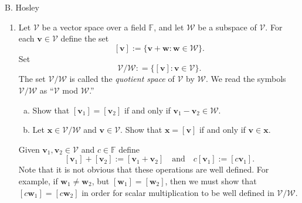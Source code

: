 \documentclass[12pt]{amsart}
\newcommand{\1}{\mathbbm{1}}
\numberwithin{equation}{section}
\numberwithin{Theorem}{section}
\theoremstyle{plain} %
\theoremstyle{definition}
\theoremstyle{remark}
\begin{document}
\thispagestyle{empty}

\hspace{\fill} {\Large B. Hosley}
\bigskip


\begin{enumerate}[1.]



\item Let \(\mathcal{V}\) be a vector space over a field \(\mathbb{F}\), and let \(\mathcal{W}\) be a subspace of \(\mathcal{V}\). For each \(\mathbf{v}\in\mathcal{V}\) define the set
\[[\mathbf{v}]:=\{\mathbf{v}+\mathbf{w} : \mathbf{w}\in\mathcal{W}\}.\]
Set
\[\mathcal{V}/\mathcal{W}: = \{[\mathbf{v}] : \mathbf{v}\in\mathcal{V}\}.\]
The set \(\mathcal{V}/\mathcal{W}\) is called the \textit{quotient space} of \(\mathcal{V}\) by \(\mathcal{W}\). We read the symbols \(\mathcal{V}/\mathcal{W}\) as ``\(\mathcal{V}\) mod \(\mathcal{W}\).''



\bigskip

\begin{enumerate}[(a)]



\item Show that \([\mathbf{v}_{1}]=[\mathbf{v}_{2}]\) if and only if \(\mathbf{v}_{1}-\mathbf{v}_{2}\in\mathcal{W}\).

\bigskip

\item Let \(\mathbf{x}\in\mathcal{V}/\mathcal{W}\) and \(\mathbf{v}\in\mathcal{V}\). Show that \(\mathbf{x}=[\mathbf{v}]\) if and only if \(\mathbf{v}\in\mathbf{x}\).

\bigskip

\end{enumerate}

\noindent Given \(\mathbf{v}_{1},\mathbf{v}_{2}\in\mathcal{V}\) and \(c\in\mathbb{F}\) define
\[[\mathbf{v}_{1}]+[\mathbf{v}_{2}]:=[\mathbf{v}_{1}+\mathbf{v}_{2}]\quad\text{and}\quad c[\mathbf{v}_{1}] := [c\mathbf{v}_{1}].\]
Note that it is not obvious that these operations are well defined. For example, if \(\mathbf{w}_{1}\neq \mathbf{w}_{2}\), but \([\mathbf{w}_{1}]=[\mathbf{w}_{2}]\), then we must show that \([c\mathbf{w}_{1}]=[c\mathbf{w}_{2}]\) in order for scalar multiplication to be well defined in \(\mathcal{V}/\mathcal{W}\).\bigskip

\begin{enumerate}[(a)]

\addtocounter{enumii}{2}


\end{enumerate}
\end{enumerate}
\end{document}
